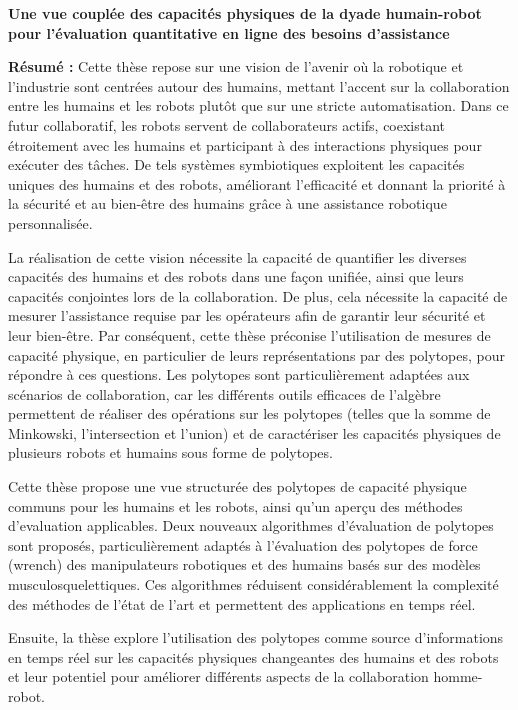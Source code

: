 \documentclass[french,12pt,a4paper]{report}
\begin{document}
\thispagestyle{empty}
\vspace*{\fill}
\begin{small}
\begin{center}
\textbf{Une vue couplée des capacités physiques de la dyade humain-robot pour l'évaluation quantitative en ligne des besoins d'assistance}
\end{center}    
\textbf{Résumé :} 
Cette thèse repose sur une vision de l'avenir où la robotique et l'industrie sont centrées autour des humains, mettant l'accent sur la collaboration entre les humains et les robots plutôt que sur une stricte automatisation. Dans ce futur collaboratif, les robots servent de collaborateurs actifs, coexistant étroitement avec les humains et participant à des interactions physiques pour exécuter des tâches. De tels systèmes symbiotiques exploitent les capacités uniques des humains et des robots, améliorant l'efficacité et donnant la priorité à la sécurité et au bien-être des humains grâce à une assistance robotique personnalisée.

La réalisation de cette vision nécessite la capacité de quantifier les diverses capacités des humains et des robots dans une façon unifiée, ainsi que leurs capacités conjointes lors de la collaboration. De plus, cela nécessite la capacité de mesurer l'assistance requise par les opérateurs afin de garantir leur sécurité et leur bien-être. Par conséquent, cette thèse préconise l'utilisation de mesures de capacité physique, en particulier de leurs représentations par des polytopes, pour répondre à ces questions. Les polytopes sont particulièrement adaptées aux scénarios de collaboration, car les différents outils efficaces de l'algèbre permettent de réaliser des opérations sur les polytopes (telles que la somme de Minkowski, l'intersection et l'union) et de caractériser les capacités physiques de plusieurs robots et humains sous forme de polytopes.

Cette thèse propose une vue structurée des polytopes de capacité physique communs pour les humains et les robots, ainsi qu'un aperçu des méthodes d'evaluation applicables. Deux nouveaux algorithmes d'évaluation de polytopes sont proposés, particulièrement adaptés à l'évaluation des polytopes de force (wrench) des manipulateurs robotiques et des humains basés sur des modèles musculosquelettiques. Ces algorithmes réduisent considérablement la complexité des méthodes de l'état de l'art et permettent des applications en temps réel.

Ensuite, la thèse explore l'utilisation des polytopes comme source d'informations en temps réel sur les capacités physiques changeantes des humains et des robots et leur potentiel pour améliorer différents aspects de la collaboration homme-robot.


\end{small}
\end{document}
